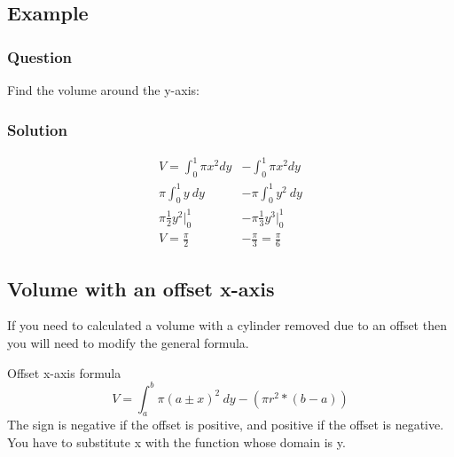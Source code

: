 \documentclass[letterpaper,10pt,twoside,twocolumn,openany]{book}
\begin{document}
\subsection{Example}
\subsubsection*{Question}
Find the volume around the y-axis:
\subsubsection*{Solution}
\begin{align*}
    V = \int_0^1 \pi x^2 dy &- \int_0^1 \pi x^2 dy\\
    \pi \int_0^1 y\ dy &- \pi \int_0^1 y^2\ dy\\
    \pi \frac{1}{2}y^2\Big|_0^1 &- \pi \frac{1}{3}y^3 \Big|_0^1\\
    V = \frac{\pi}{2} &- \frac{\pi}{3} = \frac{\pi}{6} 
\end{align*}
\subsection{Volume with an offset x-axis}
If you need to calculated a volume with a cylinder removed due to an offset then you will need to modify the general formula.
\begin{DndSidebar}[]{Offset x-axis formula}
    \begin{equation}
        V = \int_a^b \pi (a \pm x)^2\ dy - (\pi r^2 * (b-a))
    \end{equation}
    The sign is negative if the offset is positive, and positive if the offset is negative.
    You have to substitute x with the function whose domain is y.
\end{DndSidebar}
\newpage
\end{document}
